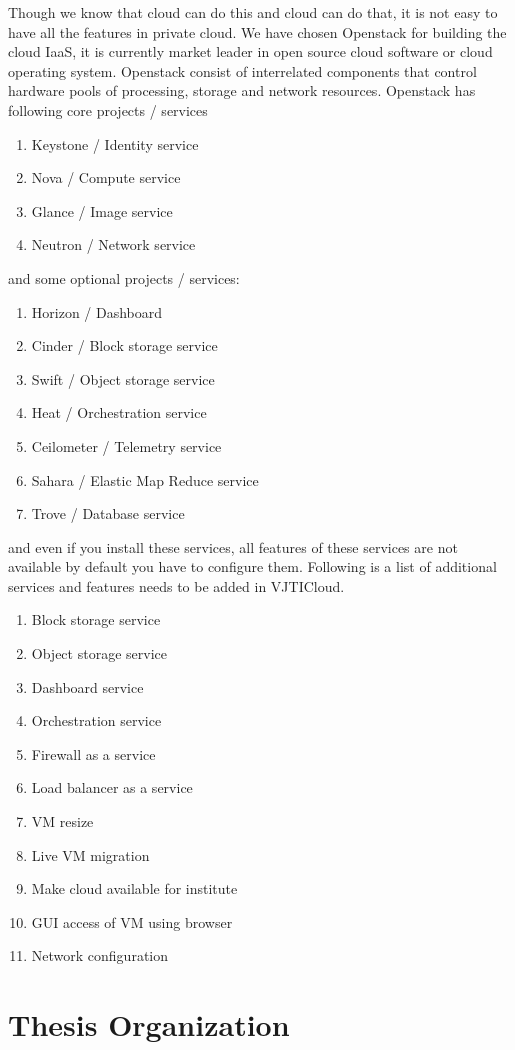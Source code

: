 Though we know that cloud can do this and cloud can do that, it is not easy to have all the features in private cloud. We have chosen Openstack for building the cloud IaaS, it is currently market leader in open source cloud software or cloud operating system. Openstack consist of interrelated components that control hardware pools of processing, storage and network resources\cite{wiki}. Openstack has following core projects / services
\begin{enumerate}
    \item Keystone / Identity service
    \item Nova / Compute service
    \item Glance / Image service
    \item Neutron / Network service
\end{enumerate}

and some optional projects / services:
\begin{enumerate}
    \item Horizon / Dashboard
    \item Cinder / Block storage service
    \item Swift / Object storage service
    \item Heat / Orchestration service
    \item Ceilometer / Telemetry service
    \item Sahara / Elastic Map Reduce service
    \item Trove / Database service
\end{enumerate}

and even if you install these services, all features of these services are not available by default you have to configure them. Following is a list of additional services and features needs to be added in VJTICloud.

\begin{enumerate}
  \item Block storage service
  \item Object storage service
  \item Dashboard service
  \item Orchestration service
  \item Firewall as a service
  \item Load balancer as a service
  \item VM resize 
  \item Live VM migration
  \item Make cloud available for institute
  \item GUI access of VM using browser
  \item Network configuration
  
\end{enumerate}

\section{Thesis Organization}

\makeatother
